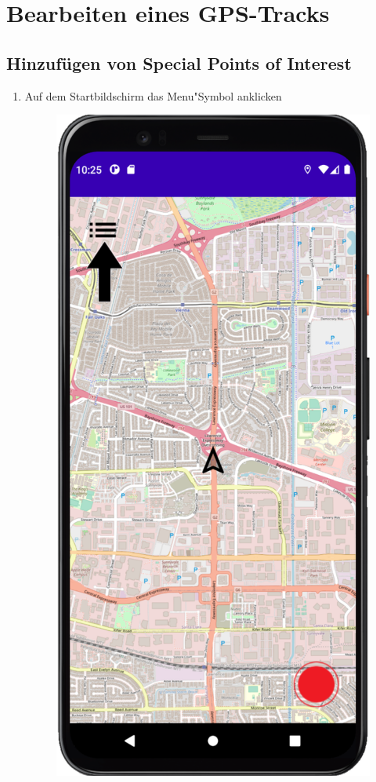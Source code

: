 \documentclass{article}
\begin{document}
\newpage

\section{Bearbeiten eines GPS-Tracks}
\subsection{Hinzufügen von Special Points of Interest}
	\begin{enumerate}
		\item Auf dem Startbildschirm das \glqq Menu"\space Symbol anklicken
		\begin{figure}[H]
			\includegraphics[scale=1]{spoi_pic1.png}

\end{figure}
\end{enumerate}
\end{document}
